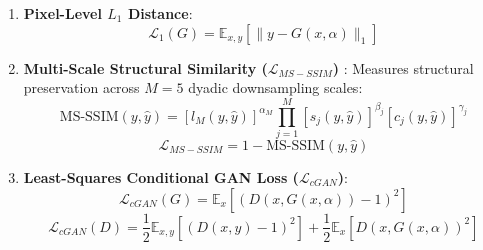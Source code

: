 \begin{enumerate}
    \item \textbf{Pixel-Level $L_1$ Distance}:
    \begin{equation}
    \mathcal{L}_1(G) = \mathbb{E}_{x, y} \left[ \| y - G(x, \alpha) \|_1 \right]
    \end{equation}
    \item \textbf{Multi-Scale Structural Similarity ($\mathcal{L}_{MS-SSIM}$)} \cite{wang2003multiscale}:
    Measures structural preservation across $M = 5$ dyadic downsampling scales:
    \begin{equation}
    \text{MS-SSIM}(y, \hat{y}) = [l_M(y, \hat{y})]^{\alpha_M} \prod_{j=1}^M [s_j(y, \hat{y})]^{\beta_j} [c_j(y, \hat{y})]^{\gamma_j}
    \end{equation}
    \begin{equation}
    \mathcal{L}_{MS-SSIM} = 1 - \text{MS-SSIM}(y, \hat{y})
    \end{equation}
    \item \textbf{Least-Squares Conditional GAN Loss ($\mathcal{L}_{cGAN}$)}:
    \begin{equation}
    \mathcal{L}_{cGAN}(G) = \mathbb{E}_{x} \left[ \left( D(x, G(x, \alpha)) - 1 \right)^2 \right]
    \end{equation}
    \begin{equation}
    \mathcal{L}_{cGAN}(D) = \frac{1}{2} \mathbb{E}_{x, y} \left[ \left( D(x, y) - 1 \right)^2 \right] + \frac{1}{2} \mathbb{E}_{x} \left[ D(x, G(x, \alpha))^2 \right]
    \end{equation}
\end{enumerate}

